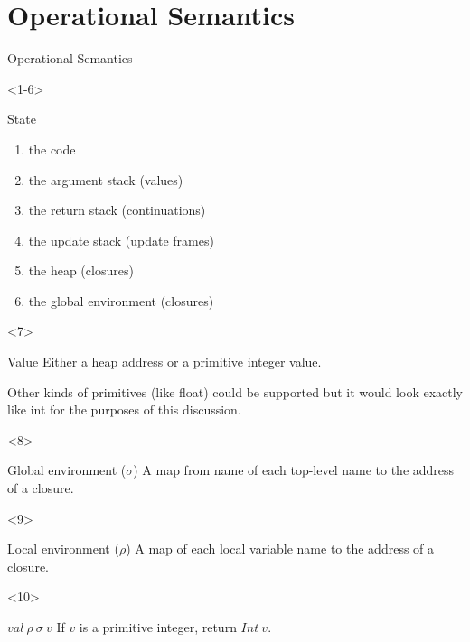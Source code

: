 \documentclass{beamer}
\begin{document}
\section{Operational Semantics}

\begin{frame}[fragile]{Operational Semantics}
  \begin{onlyenv}<1-6>
    \begin{block}{State}
      \begin{enumerate}
      \item<1-> the code
      \item<2-> the argument stack (values)
      \item<3-> the return stack (continuations)
      \item<4-> the update stack (update frames)
      \item<5-> the heap (closures)
      \item<6-> the global environment (closures)
      \end{enumerate}
    \end{block}
  \end{onlyenv}

  \begin{onlyenv}<7>
    \begin{block}{Value}
      Either a heap address or a primitive integer value.

      Other kinds of primitives (like float) could be supported but it would
      look exactly like int for the purposes of this discussion.
    \end{block}
  \end{onlyenv}

  \begin{onlyenv}<8>
    \begin{block}{Global environment ($\sigma$)}
      A map from name of each top-level name to the address of a closure.
    \end{block}
  \end{onlyenv}

  \begin{onlyenv}<9>
    \begin{block}{Local environment ($\rho$)}
      A map of each local variable name to the address of a closure.
    \end{block}
  \end{onlyenv}

  \begin{onlyenv}<10>
    \begin{block}{$val\ \rho\ \sigma\ v$}
      If $v$ is a primitive integer, return $Int\ v$.


\end{block}
\end{onlyenv}
\end{frame}
\end{document}
